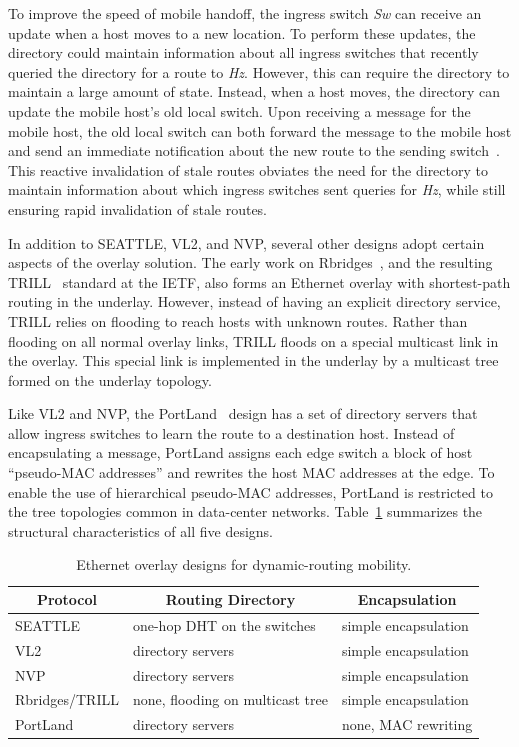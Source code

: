 To improve the speed of mobile handoff, the ingress switch {\it Sw}
can receive an update when a host moves to a new location.  To perform
these updates, the directory could maintain information about all
ingress switches that recently queried the directory for a route to
{\it Hz}.  However, this can require the directory to maintain a large
amount of state.  Instead, when a host moves, the directory can update
the mobile host's old local switch.  Upon receiving a message for the
mobile host, the old local switch can both forward the message to the
mobile host and send an immediate notification about the new route to
the sending switch~\cite{seattle}.  This reactive invalidation of
stale routes obviates the need for the directory to maintain
information about which ingress switches sent queries for {\it Hz},
while still ensuring rapid invalidation of stale routes.

In addition to SEATTLE, VL2, and NVP, several other designs adopt
certain aspects of the overlay solution.  
The early work on
Rbridges~\cite{rbridges}, and the resulting TRILL~\cite{rfc5556}
standard at the IETF, also forms an Ethernet overlay with
shortest-path routing in the underlay.  
However, instead of having an
explicit directory service, TRILL relies on flooding to reach hosts
with unknown routes.  
Rather than flooding on all normal overlay links, TRILL floods
on a special multicast link in the overlay.
This special link is implemented in the underlay by a multicast tree
formed on the underlay topology.

Like VL2 and NVP, the PortLand~\cite{portland} design
has a set of directory servers that allow ingress switches to learn
the route to a destination host.  Instead of encapsulating a message,
PortLand assigns each edge switch a block of host ``pseudo-MAC
addresses'' and rewrites the host MAC addresses at the edge.  To
enable the use of hierarchical pseudo-MAC addresses, PortLand is
restricted to the tree topologies common in data-center networks.
Table~\ref{tab:overlays} summarizes the structural characteristics
of all five designs.

\begin{table}
\begin{center}
\begin{tabular}{|l|l|l|} \hline
\multicolumn{1}{|c|}{\bf Protocol} &
 \multicolumn{1}{c|}{\bf Routing Directory} &
 \multicolumn{1}{c|}{\bf Encapsulation} \\ \hline
SEATTLE &
 one-hop DHT on the switches &
 simple encapsulation \\
VL2 &
 directory servers &
 simple encapsulation \\
NVP &
  directory servers &
  simple encapsulation\\
Rbridges/TRILL &
  none, flooding on multicast tree &
  simple encapsulation\\
PortLand &
 directory servers &
 none, MAC rewriting\\
\hline 
\end{tabular}
\end{center}
\caption{Ethernet overlay designs for dynamic-routing mobility.}
\label{tab:overlays}
\end{table}

